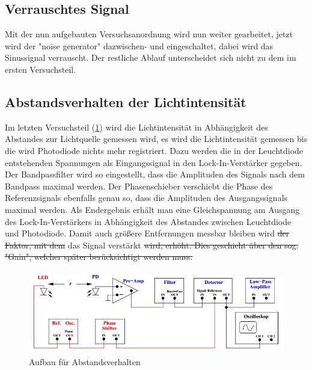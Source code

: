 \subsection{Verrauschtes Signal}

Mit der nun aufgebauten Versuchsanordnung wird nun weiter gearbeitet,
jetzt wird der "noise generator"  dazwischen- und eingeschaltet, dabei wird das Sinussignal verrauscht. Der restliche Ablauf unterscheidet sich nicht zu dem im ersten Versuchsteil.

\subsection{Abstandsverhalten der Lichtintensität}

Im letzten Versuchsteil (\cref{fig:Aufbau2}) wird die Lichtintensität in Abhängigkeit des Abstandes zur Lichtquelle
gemessen wird, es wird die Lichtintensität gemessen bis die wird Photodiode nichts mehr registriert. Dazu werden die in der Leuchtdiode entstehenden Spannungen als Eingangssignal in den Lock-In-Verstärker gegeben. Der Bandpassfilter wird so eingestellt, dass die Amplituden des Signals nach dem Bandpass maximal werden. Der Phasenschieber verschiebt die Phase des Referenzsignals ebenfalls genau so, dass die Amplituden des Ausgangssignals maximal werden. Als Endergebnis erhält man eine Gleichspannung am Ausgang des Lock-In-Verstärkers in Abhängigkeit des Abstandes zwischen Leuchtdiode und Photodiode. Damit auch größere Entfernungen messbar bleiben wird \sout{der Faktor, mit dem} das Signal verstärkt \sout{wird, erhöht. Dies geschieht über den sog. "Gain", welcher später berücksichtigt werden muss.}



\begin{figure}[h]
	\centering
	\includegraphics[scale=0.8]{Grafiken/V303Aufbau2.jpg}
	\caption{Aufbau für Abstandsverhalten}
	\label{fig:Aufbau2}
\end{figure}
